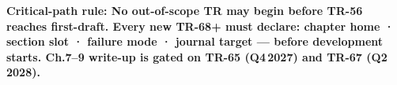 \documentclass[11pt,a4paper]{article}
\begin{document}
\vspace{6pt}
\noindent\colorbox{warnred!10}{\parbox{\dimexpr\linewidth-2\fboxsep\relax}{%
\color{warnred}\bfseries Critical-path rule:\normalfont\color{black}\enspace
No out-of-scope TR may begin before TR-56 reaches first-draft.
Every new TR-68+ must declare: chapter home · section slot ·
failure mode · journal target — before development starts.
Ch.7--9 write-up is gated on TR-65 (Q4\,2027) and TR-67 (Q2\,2028).}}
\end{document}
